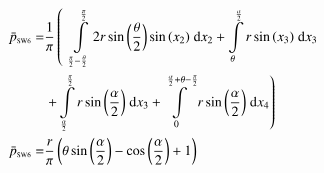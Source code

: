 \begin{align}
    \bar{p}_{\text{\tiny{SW6}}} =&\frac{1}{\pi} \left(\;\;\int\limits_{\frac{\pi}{2} - \frac{\theta}{2}}^{\frac{\pi}{2}}2 r \sin{\left (\frac{\theta}{2} \right )} \sin{\left (x_{2} \right )}\;\mathrm{d}x_{2}+\int\limits_{\theta}^{\frac{\alpha}{2}}r \sin{\left (x_{3} \right )}\;\mathrm{d}x_{3}\right.\notag\\
 &\left.+\int\limits_{\frac{\alpha}{2}}^{\frac{\pi}{2}}r \sin{\left (\frac{\alpha}{2} \right )}\;\mathrm{d}x_{3}+\int\limits_{0}^{\frac{\alpha}{2} + \theta - \frac{\pi}{2}}r \sin{\left (\frac{\alpha}{2} \right )}\;\mathrm{d}x_{4}\right)\label{pSW6Def}\\
    \bar{p}_{\text{\tiny{SW6}}}  =& \frac{r}{\pi} \left(\theta \sin{\left (\frac{\alpha}{2} \right )} - \cos{\left (\frac{\alpha}{2} \right )} + 1\right)\label{pSW6Sln}
\end{align}